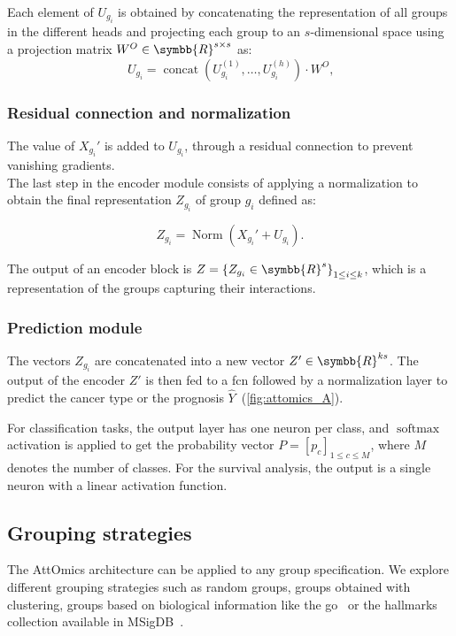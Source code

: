 \documentclass[../main.tex]{subfiles}
\begin{document}
			Each element of \(U_{g_i}\) is obtained by concatenating the representation of all groups in the different heads and projecting each group to an \(s\)-dimensional space using a projection matrix \(W^O \in \symbb{R}^{s\times s}\) as:
			\[ U_{g_i} = \operatorname{concat}\left( U^{(1)}_{g_i}, \ldots, U^{(h)}_{g_i} \right) \cdot W^O \text{,}\]
		\subsubsection{Residual connection and normalization}
			The value of \(X_{g_i}'\) is added to \(U_{g_i}\), through a residual connection to prevent vanishing gradients.\\
			The last step in the encoder module consists of applying a normalization to obtain the final representation \(Z_{g_i}\) of group \(g_i\) defined as:

			\[Z_{g_i} = \operatorname{Norm}\left(X_{g_i}' + U_{g_i} \right) \text{.}\]

			The output of an encoder block is \(Z = {\left\{ Z_{g_i} \in \symbb{R}^{s}\right\}}_{1 \leq i \leq k}\), which is a representation of the groups capturing their interactions.

		\subsubsection{Prediction module}
			The vectors \(Z_{g_i}\) are concatenated into a new vector \(Z' \in \symbb{R}^{ks}\).
			The output of the encoder \(Z'\) is then fed to a \gls{fcn} followed by a normalization layer to predict the cancer type or the prognosis \(\hat{Y}\)~(\cref{fig:attomics_A}).

			For classification tasks, the output layer has one neuron per class, and \(\operatorname{softmax}\) activation is applied to get the probability vector \(P = {\left[p_c\right]}_{1\leq c\leq M}\), where \(M\) denotes the number of classes.
			For the survival analysis, the output is a single neuron with a linear activation function.

	\subsection{Grouping strategies}\label{sec:grouping}

		The AttOmics architecture can be applied to any group specification.
		We explore different grouping strategies such as random groups, groups obtained with clustering, groups based on biological information like the \gls{go}~\cite{geneontologyconsortiumGeneOntologyResource2021} or the hallmarks collection available in MSigDB~\cite{Liberzon2015}.
\end{document}
